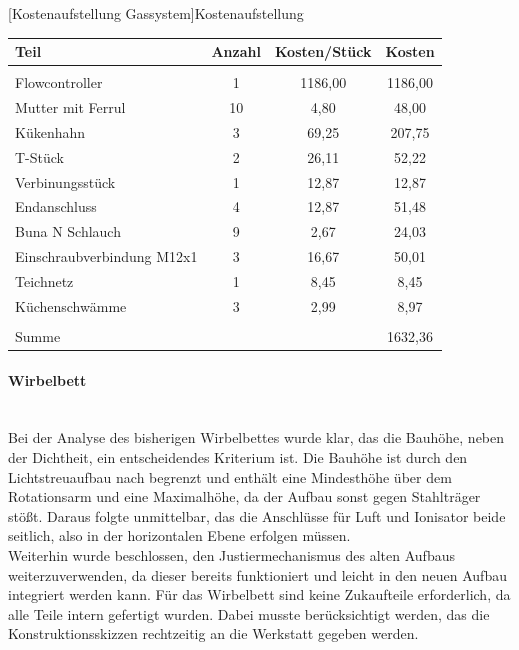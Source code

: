 \begin{center}
	[Kostenaufstellung Gassystem]{Kostenaufstellung}
	\begin{tabular}{|l|S|S|S|}
		{Teil}  & {Anzahl} & {Kosten/Stück} & {Kosten} \\
		\hline
		&       &       &  \\
		{Flowcontroller} & 1     & 1186,00  & 1186,00 \\
		{Mutter mit Ferrul} & 10    & 4,80   & 48,00 \\
		{Kükenhahn} & 3     & 69,25 & 207,75 \\
		{T-Stück} & 2     & 26,11 & 52,22 \\
		{Verbinungsstück} & 1     & 12,87 & 12,87 \\
		{Endanschluss} & 4     & 12,87 & 51,48 \\
		{Buna N Schlauch} & 9     & 2,67  & 24,03 \\
		{Einschraubverbindung M12x1} & 3     & 16,67 & 50,01 \\
		{Teichnetz} & 1     & 8,45  & 8,45 \\
		{Küchenschwämme} & 3     & 2,99  & 8,97 \\
		\hline 
		&       &       &  \\
		{Summe} &       &       & 1632,36 \\
	\end{tabular}
\end{center}

\vspace{0.5cm}

\paragraph{Wirbelbett}
\hfill \\
Bei der Analyse des bisherigen Wirbelbettes wurde klar, das die Bauhöhe, neben der Dichtheit, ein entscheidendes Kriterium ist. Die Bauhöhe ist durch den Lichtstreuaufbau nach begrenzt und enthält eine Mindesthöhe über dem Rotationsarm und eine Maximalhöhe, da der Aufbau sonst gegen Stahlträger stößt. Daraus folgte unmittelbar, das die Anschlüsse für Luft und Ionisator beide seitlich, also in der horizontalen Ebene erfolgen müssen. \\
Weiterhin wurde beschlossen, den Justiermechanismus des alten Aufbaus weiterzuverwenden, da dieser bereits funktioniert und leicht in den neuen Aufbau integriert werden kann. Für das Wirbelbett sind keine Zukaufteile erforderlich, da alle Teile intern gefertigt wurden. Dabei musste berücksichtigt werden, das die Konstruktionsskizzen rechtzeitig an die Werkstatt gegeben werden. 


